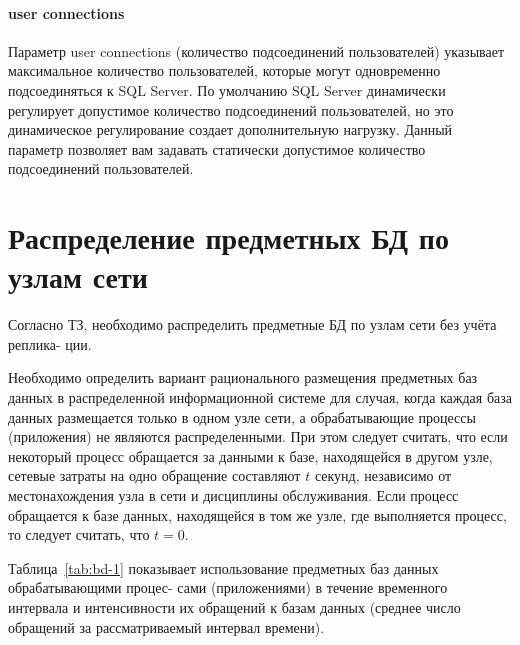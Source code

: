 \documentclass[russian,utf8,emptystyle]{eskdtext}
\begin{document}
\paragraph{user connections}

Параметр user connections (количество подсоединений пользователей) указывает максимальное количество пользователей, которые могут одновременно подсоединяться к SQL Server. По умолчанию SQL Server динамически регулирует допустимое количество подсоединений пользователей, но это динамическое регулирование создает дополнительную нагрузку. Данный параметр позволяет вам задавать статически допустимое количество подсоединений пользователей.


\clearpage
\section{Распределение предметных БД по узлам сети}

Согласно ТЗ, необходимо распределить предметные БД по узлам сети без учёта реплика-
ции.

Необходимо определить вариант рационального размещения предметных баз данных в распределенной информационной системе для случая, когда каждая база данных размещается только в одном узле сети, а обрабатывающие процессы (приложения) не являются распределенными. При этом следует считать, что если некоторый процесс обращается за данными к базе, находящейся в другом узле, сетевые затраты на одно обращение составляют $t$ секунд, независимо от местонахождения узла в сети и дисциплины обслуживания. Если процесс обращается к базе данных, находящейся в том же узле, где выполняется процесс, то следует считать, что $t = 0$.

Таблица~\ref{tab:bd-1} показывает использование предметных баз данных обрабатывающими процес-
сами (приложениями) в течение временного интервала и интенсивности их обращений к базам
данных (среднее число обращений за рассматриваемый интервал времени).
\end{document}

